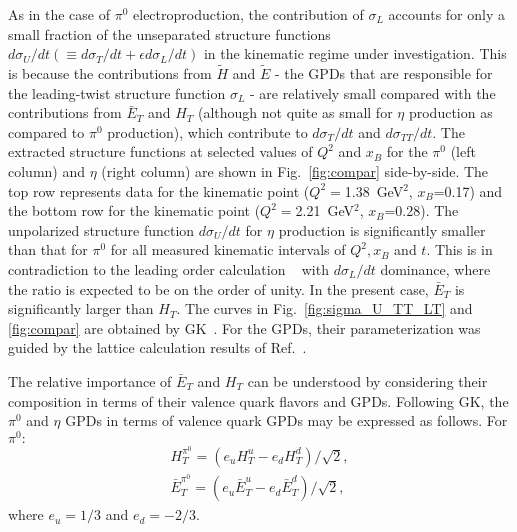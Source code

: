 \documentclass[prc,aps,floatfix,showpacs,showkeys,twocolumn,superscriptaddress,letterpaper,10pt]{revtex4-1}
\begin{document}
As in the case of $\pi^0$ electroproduction, the contribution of $\sigma_L$  accounts for only a small fraction  of the unseparated  structure functions $d\sigma_U/dt (\equiv d\sigma_T/dt+ \epsilon d\sigma_L/dt)$ in the kinematic regime under investigation. This is because  the contributions from $\tilde H$  and $\tilde E$ - the GPDs that are responsible for the leading-twist structure function $\sigma_L$ -  are  relatively small compared with the contributions from $\bar E_T$  and $H_T$ (although not quite as small for $\eta$ production as compared to $\pi^0$ production), which contribute to $d\sigma_T/dt$ and $d\sigma_{TT}/dt$. 
The extracted structure functions  at selected values  of $Q^2$ and $x_B$ for 
the $\pi^0$ (left column) and $\eta$ (right column) are shown in Fig.~\ref{fig:compar} side-by-side. The top row represents data for the kinematic point  ($Q^2=$1.38~GeV$^2$, $x_B$=0.17)
and the bottom row for the kinematic point ($Q^2=$2.21~GeV$^2$, $x_B$=0.28).
The unpolarized structure function $d\sigma_U/dt$ for $\eta$ production is   significantly smaller than that for $\pi^0$ for all measured kinematic intervals of $Q^2, x_B$ and $t$. This is in contradiction to the leading order calculation ~\cite{Eides:1998ch} with $d\sigma_L/dt$ dominance,  where the ratio is expected to be on the order of unity.  In the present case,  $\bar E_T$ is significantly larger than  $H_T$.
 The curves in Fig.~\ref{fig:sigma_U_TT_LT} and \ref{fig:compar} are obtained by GK~\cite{Goloskokov:2011rd}. For the GPDs,  their parameterization was guided by the lattice calculation results of Ref.~\cite{Gockeler:2006zu}.  




 
The  relative importance of $\bar E_T$  and $H_T$ can be understood by considering their  composition in terms of their valence quark flavors and  GPDs. Following GK, the $ \pi^0$ and $\eta$ GPDs in terms of valence quark GPDs may be expressed as follows.
\noindent  For $ \pi^0:$
\begin{equation}    
\begin{split}
 H_T^{\pi^0} =(e_u H_T^u - e_d  H_T^d) /{\sqrt{2}} , \\
 \bar E_T^{\pi^0} =(e_u \bar E_T^{u} - e_d  \bar E_T^{d}) / {\sqrt{2}},
\label{eq:pi0}
\end{split}
\end{equation}
\noindent where $e_u=1/3$ and $e_d =-2/3$. 
\end{document}
